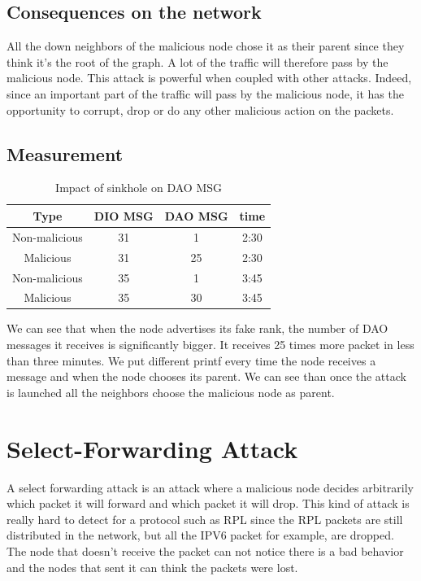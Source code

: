 \documentclass{report}
\begin{document}
\subsection*{Consequences on the network}
All the down neighbors of the malicious node chose it as their parent
since they think it's the root of the graph. A lot of the traffic will
therefore pass by the malicious node. This attack is powerful when
coupled with other attacks. Indeed, since an important part of the
traffic will pass by the malicious node, it has the opportunity to
corrupt, drop or do any other malicious action on the packets.



\subsection*{Measurement}
\begin{table}[h!]
	\centering
	\caption{Impact of  sinkhole on DAO MSG}
	\begin{tabular}{cccc}
		\toprule
		Type&DIO MSG & DAO MSG&time\\
		\midrule
		Non-malicious&31&1&2:30\\
		Malicious&31&25&2:30\\
		Non-malicious&35&1&3:45\\%
		Malicious&35&30&3:45\\
		\bottomrule
	\end{tabular}
\end{table}
We can see that when the node advertises its fake rank, the number of
DAO messages it receives is significantly bigger. It receives 25 times
more packet in less than three minutes. We put different printf every
time the node receives a message and when the node chooses its parent.
We can see than once the attack is launched all the neighbors choose the
malicious node as parent. 

\section{Select-Forwarding Attack}
A select forwarding attack is an attack where a malicious node decides
arbitrarily which packet it will forward and which packet it will drop.
This kind of attack is really hard to detect for a protocol such as RPL
since the RPL packets are still distributed in the network, but all the
IPV6 packet for example, are dropped. The node that doesn't receive the
packet can not notice there is a bad behavior and the nodes that sent it
can think the packets were lost. 
\end{document}
